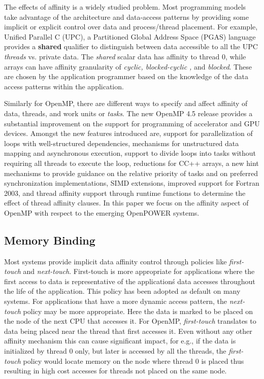 The effects of affinity is a widely studied problem. Most programming models 
take advantage of the architecture and data-access patterns by providing some 
implicit or explicit control over data and process/thread placement. For example,
Unified Parallel C (UPC), a Partitioned Global Address Space (PGAS) language 
provides a \textbf{shared} qualifier to distinguish between data 
accessible to all the UPC \textit{threads} vs. private data. The \textit{shared} scalar data has 
affinity to thread 0, while arrays can have affinity granularity of \textit{cyclic, blocked-cyclic ,}
and \textit{blocked}. These are chosen by the application programmer based on the 
knowledge of the data access patterns within the application. 

Similarly for OpenMP, there are 
different ways to specify and affect affinity of data, threads, and work units or \textit{tasks}. 
The new OpenMP 4.5 release provides a substantial 
improvement on the support for programming of accelerator and GPU devices. 
Amongst the new features introduced are, support for parallelization of loops with 
well-structured dependencies, mechanisms for unstructured data mapping and 
asynchronous execution, support to divide loops into tasks without requiring all 
threads to execute the loop, reductions for C\/C++ arrays, a new hint mechanisms to 
provide guidance on the relative priority of tasks and on preferred synchronization 
implementations, SIMD extensions, improved support for Fortran 2003, and
thread affinity support through runtime functions to determine the effect of thread 
affinity clauses. In this paper we focus on the affinity aspect of OpenMP with respect 
to the emerging OpenPOWER systems.

\subsection{Memory Binding}
Most systems provide implicit data affinity control through policies like \textit{first-touch} 
and \textit{next-touch}. First-touch is more appropriate for applications where the 
first access to data is representative of the application\'s data accesses throughout 
the life of the application. This policy has been adopted as default on many systems. 
For applications that have a more dynamic access pattern, the \textit{next-touch} 
policy may be more appropriate. Here the data is marked to be placed on the node of the 
next CPU that accesses it. For OpenMP, \textit{first-touch} translates to data being 
placed near the thread that first accesses it. Even without any other affinity mechanism this 
can cause significant impact, for e.g., if the data is initialized by thread 0 only, but later is accessed 
by all the threads, the \textit{first-touch} policy would locate memory on the node where 
thread 0 is placed thus resulting in high cost accesses for threads not placed on the same node. 

